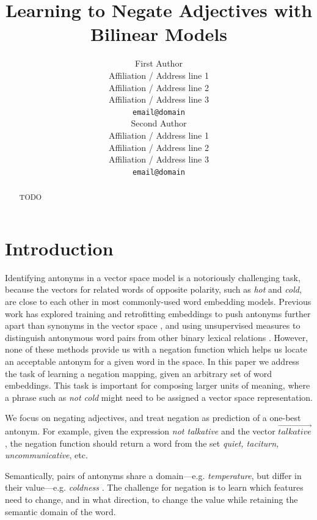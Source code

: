 \documentclass[11pt]{article}
\title{Learning to Negate Adjectives with Bilinear Models}
\author{First Author \\
  Affiliation / Address line 1 \\
  Affiliation / Address line 2 \\
  Affiliation / Address line 3 \\
  {\tt email@domain} \\\And
  Second Author \\
  Affiliation / Address line 1 \\
  Affiliation / Address line 2 \\
  Affiliation / Address line 3 \\
  {\tt email@domain} \\}
\date{}
\begin{document}
\maketitle
\begin{abstract}
 TODO
\vspace{15mm}
\end{abstract}

\section{Introduction}

Identifying antonyms in a vector space model is a notoriously
challenging task, because the vectors for related words of opposite
polarity, such as {\it hot} and {\it cold}, are close to each other in
most commonly-used word embedding models.  Previous work has explored
training and retrofitting embeddings to push antonyms further apart
than synonyms in the vector space \citep{pham:15,nguyen:16,mrksic:16},
and using unsupervised measures to distinguish antonymous word pairs
from other binary lexical relations \citep{santus:15}. However, none
of these methods provide us with a negation function which helps us
locate an acceptable antonym for a given word in the space. In this paper we
address the task of learning a negation mapping, given an arbitrary
set of word embeddings. This task is important for composing larger
units of meaning, where a phrase such as {\it not cold} might need to
be assigned a vector space representation.

We focus on negating adjectives, and treat negation as prediction of a
one-best antonym. For example, given the expression {\it not
  talkative} and the vector $\overrightarrow{\textit{talkative}}$, the negation
function should return a word from the set {\it quiet, taciturn,
  uncommunicative}, etc.


Semantically, pairs of antonyms share a domain---e.g. {\it
  temperature}, but differ in their value---e.g. {\it coldness}
\citep{turney:12,hermann:13}. The challenge for negation is to learn
which features need to change, and in what direction, to change the
value while retaining the semantic domain of the
word.
\end{document}
